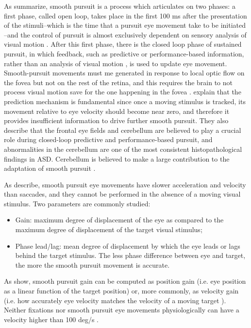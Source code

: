 As \cite{brenner2007visualsearch} summarize, smooth pursuit is a process which articulates on two phases: a first phase, called open loop, takes place in the first 100 ms after the presentation of the stimuli–which is the time that a pursuit eye movement take to be initiated \citep[pp. 298]{leigh2015neurology} –and the control of pursuit is almost exclusively dependent on sensory analysis of visual motion \citep{takarae2004smoothpursuit}. After this first phase, there is the closed loop phase of sustained pursuit, in which feedback, such as predictive or performance-based information, rather than an analysis of visual motion \citep{takarae2004smoothpursuit}, is used to update eye movement. Smooth-pursuit movements must me generated in response to local optic flow on the fovea but not on the rest of the retina, and this requires the brain to not process visual motion save for the one happening in the fovea \citep[pp. 290]{leigh2015neurology}. \cite{takarae2004smoothpursuit} explain that the prediction mechanism is fundamental since once a moving stimulus is tracked, its movement relative to eye velocity should become near zero, and therefore it provides insufficient information to drive further smooth pursuit. They also describe that the frontal eye fields and cerebellum are believed to play a crucial role during closed-loop predictive and performance-based pursuit, and abnormalities in the cerebellum are one of the most consistent histopathological findings in ASD. Cerebellum is believed to make a large contribution to the adaptation of smooth pursuit \citep[pp. 326]{leigh2015neurology}.

As \cite{wilkes2015oculomotor} describe, smooth pursuit eye movements have slower acceleration and velocity than saccades, and they cannot be performed in the absence of a moving visual stimulus. Two parameters are commonly studied:
\begin{itemize}
    \item Gain: maximum degree of displacement of the eye as compared to the maximum degree of displacement of the target visual stimulus;
    \item Phase lead/lag: mean degree of displacement by which the eye leads or lags behind the target stimulus. The less phase difference between eye and target, the more the smooth pursuit movement is accurate.
\end{itemize}

As \cite{kemner2004smoothpursuit} show, smooth pursuit gain can be computed as position gain (i.e. eye position as a linear function of the target position) or, more commonly, as velocity gain (i.e. how accurately eye velocity matches the velocity of a moving target \citep{johnson2016review}). Neither fixations nor smooth pursuit eye movements physiologically can have a velocity higher than 100 deg/s \citep{larsson2015detection}.

